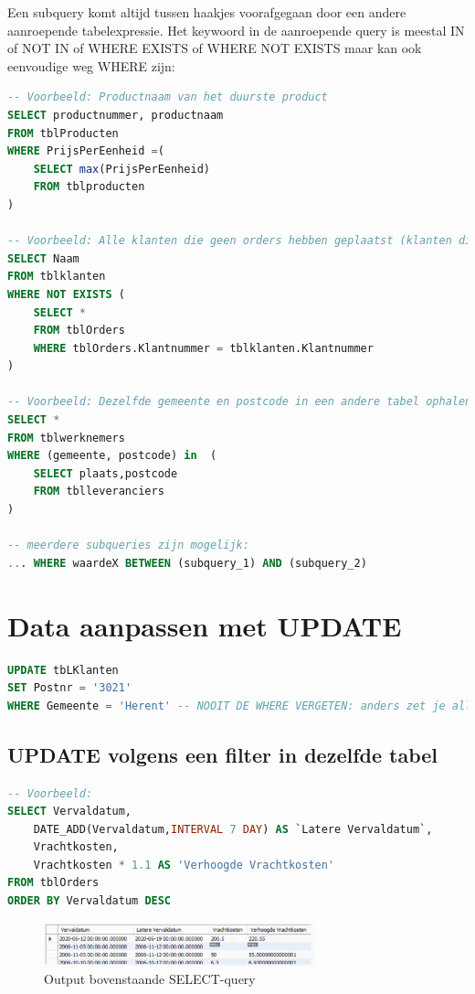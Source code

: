 \documentclass{article}
\begin{document}
Een subquery komt altijd tussen haakjes voorafgegaan door een andere aanroepende tabelexpressie. 
Het keywoord in de aanroepende query is meestal IN of NOT IN of WHERE EXISTS of WHERE NOT EXISTS maar kan ook eenvoudige weg WHERE zijn:

\begin{lstlisting}[language=SQL]
-- Voorbeeld: Productnaam van het duurste product
SELECT productnummer, productnaam 
FROM tblProducten 
WHERE PrijsPerEenheid =(
    SELECT max(PrijsPerEenheid)  
    FROM tblproducten 
)

-- Voorbeeld: Alle klanten die geen orders hebben geplaatst (klanten die niet te vinden zijn in tblOrders)
SELECT Naam 
FROM tblklanten 
WHERE NOT EXISTS (
    SELECT * 
    FROM tblOrders 
    WHERE tblOrders.Klantnummer = tblklanten.Klantnummer
) 

-- Voorbeeld: Dezelfde gemeente en postcode in een andere tabel ophalen 
SELECT * 
FROM tblwerknemers
WHERE (gemeente, postcode) in  (
    SELECT plaats,postcode 
    FROM tblleveranciers
)

-- meerdere subqueries zijn mogelijk:
... WHERE waardeX BETWEEN (subquery_1) AND (subquery_2)

\end{lstlisting}


\section{Data aanpassen met UPDATE}

\begin{lstlisting}[language=SQL]
UPDATE tbLKlanten
SET Postnr = '3021'
WHERE Gemeente = 'Herent' -- NOOIT DE WHERE VERGETEN: anders zet je alle postcodes op 3021!
\end{lstlisting}

\subsection{UPDATE volgens een filter in dezelfde tabel}

\begin{lstlisting}[language=SQL]
-- Voorbeeld: 
SELECT Vervaldatum, 
    DATE_ADD(Vervaldatum,INTERVAL 7 DAY) AS `Latere Vervaldatum`, 
    Vrachtkosten, 
    Vrachtkosten * 1.1 AS 'Verhoogde Vrachtkosten'
FROM tblOrders
ORDER BY Vervaldatum DESC
\end{lstlisting}

\begin{figure}[H]
    \centering
    \includegraphics[width=0.7\textwidth]{Screenshot_20200304_154106.png}
    \caption{Output bovenstaande SELECT-query}
\end{figure}
\end{document}
